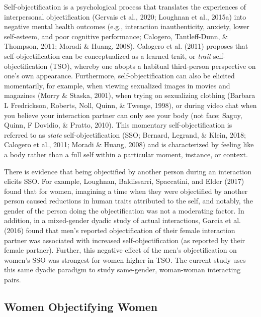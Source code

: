 \documentclass[man]{apa6}
\begin{document}
Self-objectification is a psychological process that translates the
experiences of interpersonal objectification (Gervais et al., 2020;
Loughnan et al., 2015a) into negative mental health outcomes (e.g.,
interaction inauthenticity, anxiety, lower self-esteem, and poor
cognitive performance; Calogero, Tantleff-Dunn, \& Thompson, 2011;
Moradi \& Huang, 2008). Calogero et al. (2011) proposes that
self-objectification can be conceptualized as a learned trait, or
\emph{trait} self-objectification (TSO), whereby one abopts a habitual
third-person perspective on one's own appearance. Furthermore,
self-objectification can also be elicited momentarily, for example, when
viewing sexualized images in movies and magazines (Morry \& Staska,
2001), when trying on sexualizing clothing (Barbara L Fredrickson,
Roberts, Noll, Quinn, \& Twenge, 1998), or during video chat when you
believe your interaction partner can only see your body (not face;
Saguy, Quinn, F Dovidio, \& Pratto, 2010). This momentary
self-objectification is referred to as \emph{state} self-objectification
(SSO; Bernard, Legrand, \& Klein, 2018; Calogero et al., 2011; Moradi \&
Huang, 2008) and is characterized by feeling like a body rather than a
full self within a particular moment, instance, or context.

There is evidence that being objectified by another person during an
interaction elicits SSO. For example, Loughnan, Baldissarri, Spaccatini,
and Elder (2017) found that for women, imagining a time when they were
objectified by another person caused reductions in human traits
attributed to the self, and notably, the gender of the person doing the
objectification was not a moderating factor. In addition, in a
mixed-gender dyadic study of actual interactions, Garcia et al. (2016)
found that men's reported objectification of their female interaction
partner was associated with increased self-objectification (as reported
by their female partner). Further, this negative effect of the men's
objectification on women's SSO was strongest for women higher in TSO.
The current study uses this same dyadic paradigm to study same-gender,
woman-woman interacting pairs.

\subsection{Women Objectifying Women}\label{women-objectifying-women}
\end{document}
